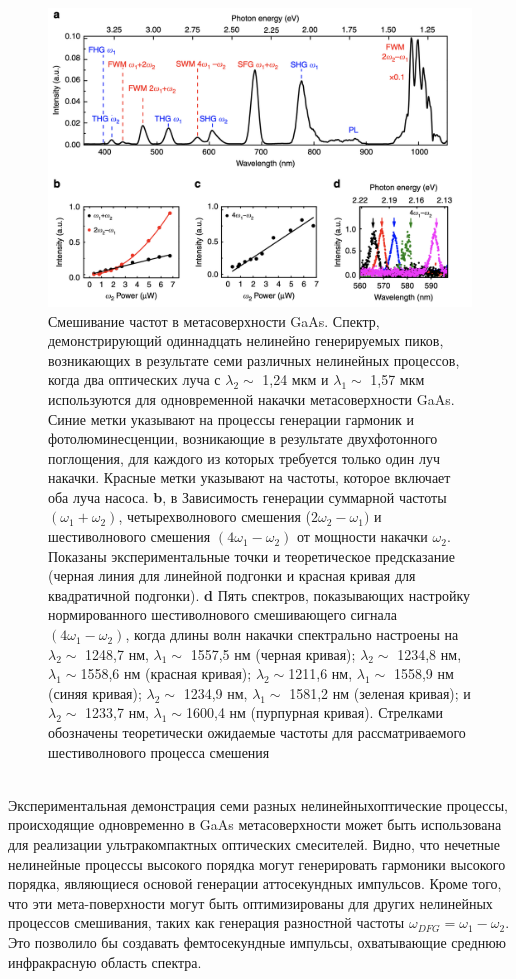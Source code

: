 \begin{figure}[h!]
	\centering
	\includegraphics[width=0.8\linewidth]{images/mixer1.png}
	\caption{Смешивание частот в метасоверхности GaAs. Спектр, демонстрирующий одиннадцать нелинейно генерируемых пиков, возникающих в результате семи различных нелинейных процессов, когда два оптических луча с  $\lambda_2 \sim$ 1,24 мкм и  $\lambda_1 \sim$ 1,57 мкм используются для одновременной накачки метасоверхности GaAs. Синие метки указывают на процессы генерации гармоник и фотолюминесценции, возникающие в результате двухфотонного поглощения, для каждого из которых требуется только один луч накачки. Красные метки указывают на частоты, которое включает оба луча насоса. \textbf{b}, в Зависимость генерации суммарной частоты $(\omega_1 + \omega_2)$, четырехволнового смешения ($2\omega_2 - \omega_1)$ и шестиволнового смешения $(4\omega_1 - \omega_2)$ от мощности накачки $\omega_2$. Показаны экспериментальные  точки и теоретическое предсказание (черная линия для линейной подгонки и красная кривая для квадратичной подгонки). \textbf{d} Пять спектров, показывающих настройку нормированного шестиволнового смешивающего сигнала $(4\omega_1 - \omega_2)$, когда длины волн накачки спектрально настроены на $\lambda_2 \sim$ 1248,7 нм,  $\lambda_1 \sim$ 1557,5 нм (черная кривая); $\lambda_2 \sim$ 1234,8 нм, $\lambda_1 \sim$1558,6 нм (красная кривая); $\lambda_2 \sim$1211,6 нм, $\lambda_1 \sim$ 1558,9 нм (синяя кривая); $\lambda_2 \sim$ 1234,9 нм, $\lambda_1 \sim$ 1581,2 нм (зеленая кривая); и $\lambda_2 \sim$ 1233,7 нм, $\lambda_1 \sim$1600,4 нм (пурпурная кривая). Стрелками обозначены теоретически ожидаемые частоты для рассматриваемого шестиволнового процесса смешения}
	\label{mixerPictr2}
\end{figure}
\\
Экспериментальная демонстрация семи разных нелинейныхоптические процессы, происходящие одновременно в GaAs метасоверхности может быть использована для реализации ультракомпактных оптических смесителей. Видно, что нечетные нелинейные процессы высокого порядка могут генерировать гармоники высокого порядка, являющиеся основой генерации аттосекундных импульсов. Кроме того, что эти мета-поверхности могут быть оптимизированы для других нелинейных процессов смешивания, таких как генерация разностной частоты $\omega_{DFG} = \omega_1 - \omega_2$. Это позволило бы создавать фемтосекундные импульсы, охватывающие среднюю инфракрасную область спектра. 
